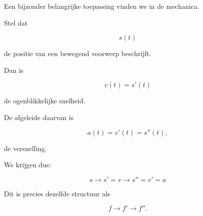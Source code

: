 \documentclass{ximera}
\begin{document}



Een bijzonder belangrijke toepassing vinden we in de mechanica.

Stel dat

\[
s(t)
\]

de positie van een bewegend voorwerp beschrijft.

Dan is

\[
v(t)=s'(t)
\]

de ogenblikkelijke snelheid.

De afgeleide daarvan is

\[
a(t)=v'(t)=s''(t),
\]

de versnelling.

We krijgen dus:

\[
\boxed{
s
\longrightarrow
s'=v
\longrightarrow
s''=v'=a
}
\]

Dit is precies dezelfde structuur als

\[
f
\longrightarrow
f'
\longrightarrow
f''.
\]


\end{document}
